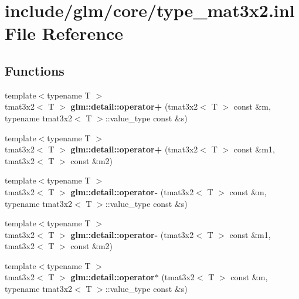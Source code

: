 \hypertarget{type__mat3x2_8inl}{\section{include/glm/core/type\-\_\-mat3x2.inl \-File \-Reference}
\label{type__mat3x2_8inl}
}
\subsection*{\-Functions}
\begin{DoxyCompactItemize}
\item 
\hypertarget{namespaceglm_1_1detail_acbd494f078f259f3efb8cf106de888ce}{{\footnotesize template$<$typename T $>$ }\\tmat3x2$<$ \-T $>$ {\bfseries glm\-::detail\-::operator+} (tmat3x2$<$ \-T $>$ const \&m, typename tmat3x2$<$ \-T $>$\-::value\-\_\-type const \&s)}\label{namespaceglm_1_1detail_acbd494f078f259f3efb8cf106de888ce}

\item 
\hypertarget{namespaceglm_1_1detail_acb17cbc96a03b624f621e7ba44fbf721}{{\footnotesize template$<$typename T $>$ }\\tmat3x2$<$ \-T $>$ {\bfseries glm\-::detail\-::operator+} (tmat3x2$<$ \-T $>$ const \&m1, tmat3x2$<$ \-T $>$ const \&m2)}\label{namespaceglm_1_1detail_acb17cbc96a03b624f621e7ba44fbf721}

\item 
\hypertarget{namespaceglm_1_1detail_a37f32531b98c0a86eb3c028a08737eee}{{\footnotesize template$<$typename T $>$ }\\tmat3x2$<$ \-T $>$ {\bfseries glm\-::detail\-::operator-\/} (tmat3x2$<$ \-T $>$ const \&m, typename tmat3x2$<$ \-T $>$\-::value\-\_\-type const \&s)}\label{namespaceglm_1_1detail_a37f32531b98c0a86eb3c028a08737eee}

\item 
\hypertarget{namespaceglm_1_1detail_afbdf76ee4e0bc344f1d8ae12f3e2a4a4}{{\footnotesize template$<$typename T $>$ }\\tmat3x2$<$ \-T $>$ {\bfseries glm\-::detail\-::operator-\/} (tmat3x2$<$ \-T $>$ const \&m1, tmat3x2$<$ \-T $>$ const \&m2)}\label{namespaceglm_1_1detail_afbdf76ee4e0bc344f1d8ae12f3e2a4a4}

\item 
\hypertarget{namespaceglm_1_1detail_a954427c1b5348f35b8f828ca3566f9bb}{{\footnotesize template$<$typename T $>$ }\\tmat3x2$<$ \-T $>$ {\bfseries glm\-::detail\-::operator$\ast$} (tmat3x2$<$ \-T $>$ const \&m, typename tmat3x2$<$ \-T $>$\-::value\-\_\-type const \&s)}\label{namespaceglm_1_1detail_a954427c1b5348f35b8f828ca3566f9bb}


\end{DoxyCompactItemize}
